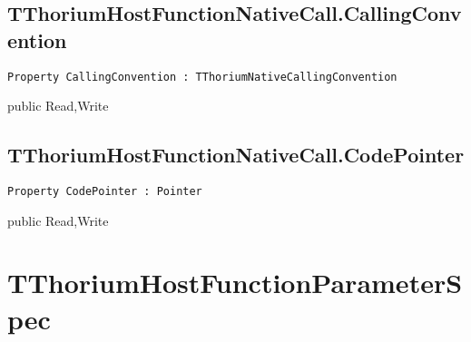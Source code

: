 \subsection{TThoriumHostFunctionNativeCall.CallingConvention}
\label{thoriumcore:thorium:tthoriumhostfunctionnativecall:callingconvention}
\begin{FPCList}
\Synopsis
\Declaration 

\begin{verbatim}
Property CallingConvention : TThoriumNativeCallingConvention
\end{verbatim}
\Visibility
public
\Access
Read,Write
\Description
\end{FPCList}
\subsection{TThoriumHostFunctionNativeCall.CodePointer}
\label{thoriumcore:thorium:tthoriumhostfunctionnativecall:codepointer}
\begin{FPCList}
\Synopsis
\Declaration 

\begin{verbatim}
Property CodePointer : Pointer
\end{verbatim}
\Visibility
public
\Access
Read,Write
\Description
\end{FPCList}
\section{TThoriumHostFunctionParameterSpec}
\label{thoriumcore:thorium:tthoriumhostfunctionparameterspec}
